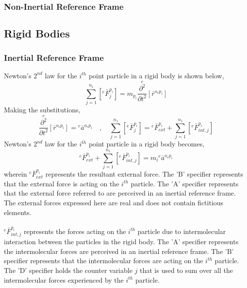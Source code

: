 \documentclass[class=report, 12pt, crop=false]{standalone}
\begin{document}
\begin{center}
\subsubsection{Non-Inertial Reference Frame}
\begin{comment}
\end{comment}
\subsection{Rigid Bodies}
\begin{comment}
\end{comment}
\subsubsection{Inertial Reference Frame}
\begin{comment}
\end{comment}
Newton's $2^{nd}$ law for the $i^{th}$ point particle in a rigid body is shown below,
$$\sum^{n_{1}}_{j = 1}\left[{}^{e}\bar{F}^{p_{i}}_{j}\right] = m_{p_{i}}\overset{e}{\frac{\partial^{2}}{\partial t^{2}}}[\bar{r}^{o_{e}p_{i}}]$$
Making the substitutions,
\begin{equation}\overset{e}{\frac{\partial^{2}}{\partial t^{2}}}[\bar{r}^{o_{e}p_{i}}] = {}^{e}\bar{a}^{o_{e}p_{i}}\quad,\quad \sum^{n_{1}}_{j = 1}\left[{}^{e}\bar{F}^{p_{i}}_{j}\right] = {}^{e}\bar{F}^{p_{i}}_{ext} + \sum^{n_{1}}_{j = 1}\left[{}^{e}\bar{F}^{p_{i}}_{int,j}\right]\label{rigid-forces}\end{equation}
Newton's $2^{nd}$ law for the $i^{th}$ point particle in a rigid body becomes,
$${}^{e}\bar{F}^{p_{i}}_{ext} + \sum^{n_{1}}_{j = 1}\left[{}^{e}\bar{F}^{p_{i}}_{int,j}\right] = m_{i}{}^{e}\bar{a}^{o_{e}p_{i}}$$
wherein ${}^{e}\bar{F}^{p_{i}}_{ext}$ represents the resultant external force. The 'B' specifier represents that the external force is acting on the $i^{th}$ particle. The 'A' specifier represents that the external force referred to are perceived in an inertial reference frame. The external forces expressed here are real and does not contain fictitious elements.
\\~\\${}^{e}\bar{F}^{p_{i}}_{int,j}$ represents the forces acting on the $i^{th}$ particle due to intermolecular interaction between the particles in the rigid body. The 'A' specifier represents the intermolecular forces are perceived in an inertial reference frame. The 'B' specifier represents that the intermolecular forces are acting on the $i^{th}$ particle. The 'D' specifier holds the counter variable $j$ that is used to sum over all the intermolecular forces experienced by the $i^{th}$ particle. 

\end{center}
\end{document}
